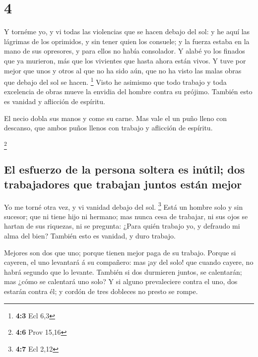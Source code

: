 \hypertarget{section-3}{%
\section{4}\label{section-3}}

 Y tornéme yo, y vi todas las violencias que se hacen
debajo del sol: y he aquí las lágrimas de los oprimidos, y sin tener
quien los consuele; y la fuerza estaba en la mano de sus opresores, y
para ellos no había consolador.  Y alabé yo los finados
que ya murieron, más que los vivientes que hasta ahora están vivos.
 Y tuve por mejor que unos y otros al que no ha sido aún,
que no ha visto las malas obras que debajo del sol se hacen. \footnote{\textbf{4:3}
  Ecl 6,3}  Visto he asimismo que todo trabajo y toda
excelencia de obras mueve la envidia del hombre contra su prójimo.
También esto es vanidad y aflicción de espíritu.

 El necio dobla sus manos y come su carne. 
Mas vale el un puño lleno con descanso, que ambos puños llenos con
trabajo y aflicción de espíritu.

\footnote{\textbf{4:6} Prov 15,16}

\hypertarget{el-esfuerzo-de-la-persona-soltera-es-inuxfatil-dos-trabajadores-que-trabajan-juntos-estuxe1n-mejor}{%
\subsection{El esfuerzo de la persona soltera es inútil; dos
trabajadores que trabajan juntos están
mejor}\label{el-esfuerzo-de-la-persona-soltera-es-inuxfatil-dos-trabajadores-que-trabajan-juntos-estuxe1n-mejor}}

 Yo me torné otra vez, y vi vanidad debajo del sol.
\footnote{\textbf{4:7} Ecl 2,12}  Está un hombre solo y
sin sucesor; que ni tiene hijo ni hermano; mas nunca cesa de trabajar,
ni sus ojos se hartan de sus riquezas, ni se pregunta: ¿Para quién
trabajo yo, y defraudo mi alma del bien? También esto es vanidad, y duro
trabajo.

 Mejores son dos que uno; porque tienen mejor paga de su
trabajo.  Porque si cayeren, el uno levantará á su
compañero: mas ¡ay del solo! que cuando cayere, no habrá segundo que lo
levante.  También si dos durmieren juntos, se calentarán;
mas ¿cómo se calentará uno solo?  Y si alguno
prevaleciere contra el uno, dos estarán contra él; y cordón de tres
dobleces no presto se rompe.

